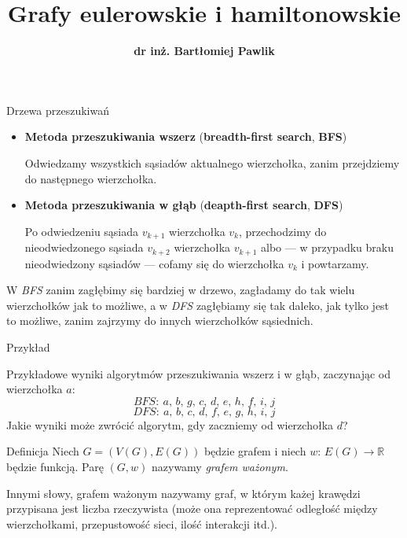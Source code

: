 \documentclass[a4paper,10pt]{beamer}
\title{\bf Grafy eulerowskie i hamiltonowskie}
\author[B. Pawlik]{\bf dr inż. Bartłomiej Pawlik}
\begin{document}
\begin{frame}
\titlepage
\end{frame}

\begin{frame}
\begin{block}{Drzewa przeszukiwań}
\begin{itemize}
\item {\bf Metoda przeszukiwania wszerz} ({\bf breadth-first search}, {\bf BFS})

Odwiedzamy wszystkich sąsiadów aktualnego wierzchołka, zanim przejdziemy do następnego wierzchołka.

\item {\bf Metoda przeszukiwania w głąb} ({\bf deapth-first search}, {\bf DFS})

Po odwiedzeniu sąsiada $v_{k+1}$ wierzchołka $v_k$, przechodzimy do nieodwiedzonego sąsiada $v_{k+2}$ wierzchołka $v_{k+1}$ albo --- w przypadku braku nieodwiedzony sąsiadów ---  cofamy się do wierzchołka $v_k$ i powtarzamy.
\end{itemize}
\end{block}

\medskip

W {\it BFS} zanim zagłębimy się bardziej w drzewo, zagładamy do tak wielu wierzchołków jak to możliwe, a w {\it DFS} zagłębiamy się tak daleko, jak tylko jest to możliwe, zanim zajrzymy do innych wierzchołków sąsiednich.
\end{frame}


\begin{frame}

\begin{exampleblock}{Przykład}
	\begin{center}
		
	\end{center}
Przykładowe wyniki algorytmów przeszukiwania wszerz i w głąb, zaczynając od wierzchołka $a$:
$$BFS:\ a,\,b,\,g,\,c,\,d,\,e,\,h,\,f,\,i,\,j$$
$$DFS:\ a,\,b,\,c,\,d,\,f,\,e,\,g,\,h,\,i,\,j$$
Jakie wyniki może zwrócić algorytm, gdy zaczniemy od wierzchołka $d$?
\end{exampleblock}

\end{frame}


\begin{frame}
	
\begin{block}{Definicja}
	Niech $G=(V(G),E(G))$ będzie grafem i niech $w:\,E(G)\to\mathbb{R}$ będzie funkcją. Parę $(G,w)$ nazywamy {\it grafem ważonym}.
\end{block}

\medskip

Innymi słowy, grafem ważonym nazywamy graf, w którym każej krawędzi przypisana jest liczba rzeczywista (może ona reprezentować odległość między wierzchołkami, przepustowość sieci, ilość interakcji itd.).

\end{frame}
\end{document}
